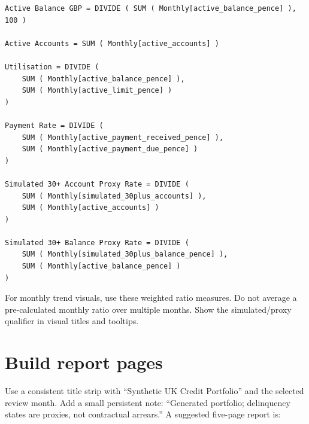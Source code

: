 \documentclass[11pt]{article}
\begin{document}
\begin{lstlisting}
Active Balance GBP = DIVIDE ( SUM ( Monthly[active_balance_pence] ), 100 )

Active Accounts = SUM ( Monthly[active_accounts] )

Utilisation = DIVIDE (
    SUM ( Monthly[active_balance_pence] ),
    SUM ( Monthly[active_limit_pence] )
)

Payment Rate = DIVIDE (
    SUM ( Monthly[active_payment_received_pence] ),
    SUM ( Monthly[active_payment_due_pence] )
)

Simulated 30+ Account Proxy Rate = DIVIDE (
    SUM ( Monthly[simulated_30plus_accounts] ),
    SUM ( Monthly[active_accounts] )
)

Simulated 30+ Balance Proxy Rate = DIVIDE (
    SUM ( Monthly[simulated_30plus_balance_pence] ),
    SUM ( Monthly[active_balance_pence] )
)
\end{lstlisting}

For monthly trend visuals, use these weighted ratio measures. Do not average a pre-calculated monthly ratio over multiple months. Show the simulated/proxy qualifier in visual titles and tooltips.

\section{Build report pages}

Use a consistent title strip with “Synthetic UK Credit Portfolio” and the selected review month. Add a small persistent note: “Generated portfolio; delinquency states are proxies, not contractual arrears.” A suggested five-page report is:
\end{document}
